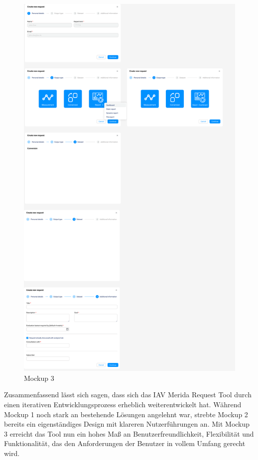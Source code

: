\begin{figure}[H]
    \centering
    \includegraphics[scale=.2]{media/MockUps3.0}
    \caption{Mockup 3}
    \label{fig:MockUps3.0}
\end{figure}
Zusammenfassend lässt sich sagen, dass sich das IAV Merida Request Tool durch einen iterativen Entwicklungsprozess erheblich weiterentwickelt hat. Während Mockup 1 noch stark an bestehende Lösungen angelehnt war, strebte Mockup 2 bereits ein eigenständiges Design mit klareren Nutzerführungen an. Mit Mockup 3 erreicht das Tool nun ein hohes Maß an Benutzerfreundlichkeit, Flexibilität und Funktionalität, das den Anforderungen der Benutzer in vollem Umfang gerecht wird.
